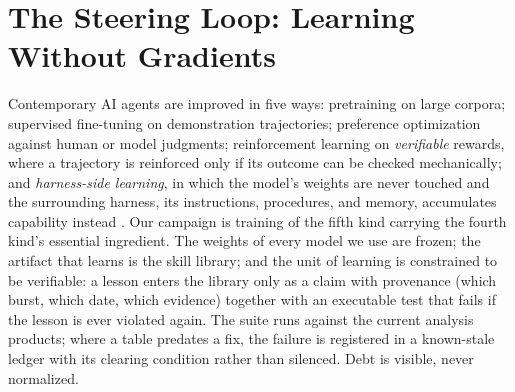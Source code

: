 \providecommand{\rc}[1]{\parbox[t]{10.2cm}{\raggedright #1}}   %
\section{The Steering Loop: Learning Without Gradients} \label{sec:learning}

Contemporary AI agents are improved in five ways: pretraining on large
corpora; supervised fine-tuning on demonstration trajectories; preference
optimization against human or model judgments; reinforcement learning on
\emph{verifiable} rewards, where a trajectory is reinforced only if its
outcome can be checked mechanically; and \emph{harness-side learning}, in
which the model's weights are never touched and the surrounding harness,
its instructions, procedures, and memory, accumulates capability instead
\citep{2025Natur.645..633G,2023arXiv230516291W,2023arXiv230311366S}. Our
campaign is training of the fifth kind carrying the fourth kind's essential
ingredient. The weights of every model we use are frozen; the artifact that
learns is the skill library; and the unit of learning is constrained to be
verifiable: a lesson enters the library only as a claim with provenance
(which burst, which date, which evidence) together with an executable test
that fails if the lesson is ever violated again. The suite runs against the
current analysis products; where a table predates a fix, the failure is
registered in a known-stale ledger with its clearing condition rather than
silenced. Debt is visible, never normalized.

